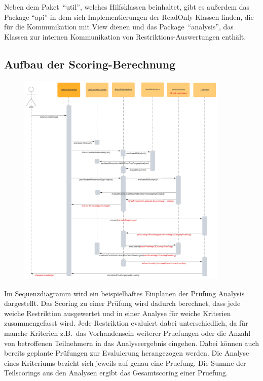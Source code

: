 Neben dem Paket~\enquote{util}, welches Hilfsklassen beinhaltet, gibt es außerdem das Package \enquote{api}
in dem sich Implementierungen der ReadOnly-Klassen finden, die für die Kommunikation mit View dienen
und das Package~\enquote{analysis}, das Klassen zur internen Kommunikation von Restriktions-Auswertungen enthält.
\pagebreak
\subsection{Aufbau der Scoring-Berechnung}\label{subsec:aufbau-der-scoring-berechnung}
\begin{figure}[!h]
    \includegraphics[width=0.9\textwidth]{extra/Sequence_diagram}\label{fig:figure}
\end{figure}

Im Sequenzdiagramm wird ein beispielhaftes Einplanen der Prüfung Analysis dargestellt.
Das Scoring zu einer Prüfung wird dadurch berechnet, dass jede weiche Restriktion ausgewertet und in
einer Analyse für weiche Kriterien zusammengefasst wird.
Jede Restriktion evaluiert dabei unterschiedlich, da für manche Kriterien z.B.\ das Vorhandensein weiterer
Pruefungen oder die Anzahl von betroffenen Teilnehmern in das Analyseergebnis eingehen.
Dabei können auch bereits geplante Prüfungen zur Evaluierung herangezogen werden.
Die Analyse eines Kriteriums bezieht sich jeweils auf genau eine Pruefung.
Die Summe der Teilscorings aus den Analysen ergibt das Gesamtscoring einer Pruefung.
